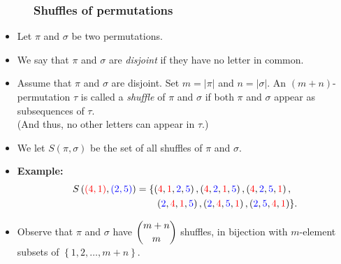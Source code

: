 \documentclass{beamer}
\newcommand{\red}{\color{red}}
\newcommand{\blue}{\color{blue}}
\newcommand{\fti}[1]{\frametitle{\ \ \ \ \ #1}}
\newcommand{\set}[1]{\left\{ #1 \right\}}
\newcommand{\abs}[1]{\left| #1 \right|}
\newcommand{\tup}[1]{\left( #1 \right)}
\newcommand{\defn}[1]{{\color{darkred}\emph{#1}}} %
\theoremstyle{plain}
\begin{document}
\begin{frame}
\fti{Shuffles of permutations}

\begin{itemize}

\item Let $\pi$ and $\sigma$ be two permutations.

\item We say that $\pi$ and $\sigma$ are \defn{disjoint} if they have
      no letter in common.

\pause

\item Assume that $\pi$ and $\sigma$ are disjoint. Set
      $m = \abs{\pi}$ and $n = \abs{\sigma}$.
      An $\tup{m+n}$-permutation $\tau$ is called a \defn{shuffle} of
      $\pi$ and $\sigma$ if both $\pi$ and $\sigma$ appear as
      subsequences of $\tau$. \\
      (And thus, no other letters can appear in $\tau$.)

\item We let $S \tup{\pi, \sigma}$ be the set of all shuffles
      of $\pi$ and $\sigma$.

\item \textbf{Example:}
      \begin{align*}
      S \tup{ {\red \tup{4, 1}} , {\blue \tup{2, 5}} }
      &= \{ \tup{ {\red 4}, {\red 1}, {\blue 2}, {\blue 5} } ,
            \tup{ {\red 4}, {\blue 2}, {\red 1}, {\blue 5} } ,
            \tup{ {\red 4}, {\blue 2}, {\blue 5}, {\red 1} } , \\
      & \qquad
            \tup{ {\blue 2}, {\red 4}, {\red 1}, {\blue 5} } ,
            \tup{ {\blue 2}, {\red 4}, {\blue 5}, {\red 1} } ,
            \tup{ {\blue 2}, {\blue 5}, {\red 4}, {\red 1} }  \} .
      \end{align*}

\pause

\item Observe that $\pi$ and $\sigma$ have $\dbinom{m+n}{m}$
      shuffles, in bijection with $m$-element subsets of
      $\set{1, 2, \ldots, m+n}$.

\end{itemize}
\end{frame}
\end{document}
